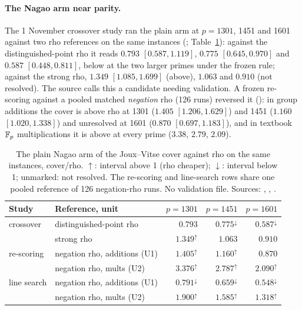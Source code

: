 \paragraph{The Nagao arm near parity.} The 1 November crossover study ran
the plain arm at $p=1301$, 1451 and 1601 against two rho references on the
same instances (;
Table~\ref{tab:jac-nagao}):
against the distinguished-point rho it reads $0.793$ $[0.587,1.119]$,
$0.775$ $[0.645,0.970]$ and $0.587$ $[0.448,0.811]$, below at the two larger
primes under the frozen rule; against the strong rho, $1.349$
$[1.085,1.699]$ (above), $1.063$ and $0.910$ (not resolved). The source calls
this a candidate needing validation. A frozen re-scoring against a pooled
matched \emph{negation} rho (126 runs) reversed it
(): in group
additions the cover is above rho at 1301 ($1.405$ $[1.206,1.629]$) and 1451
($1.160$ $[1.020,1.338]$) and unresolved at 1601 ($0.870$ $[0.697,1.183]$), and
in textbook $\mathbb{F}_p$ multiplications it is above at every prime ($3.38$, $2.79$,
$2.09$).

\begin{table}[t]
\centering\small
\begin{tabular}{@{}llrrr@{}}
\toprule
Study & Reference, unit & $p=1301$ & $p=1451$ & $p=1601$ \\
\midrule
crossover & distinguished-point rho & $0.793$ & $0.775^{\downarrow}$ & $0.587^{\downarrow}$ \\
 & strong rho & $1.349^{\uparrow}$ & $1.063$ & $0.910$ \\
\addlinespace
re-scoring & negation rho, additions (U1) & $1.405^{\uparrow}$ & $1.160^{\uparrow}$ & $0.870$ \\
 & negation rho, mults (U2) & $3.376^{\uparrow}$ & $2.787^{\uparrow}$ & $2.090^{\uparrow}$ \\
\addlinespace
line search & negation rho, additions (U1) & $0.791^{\downarrow}$ & $0.659^{\downarrow}$ & $0.548^{\downarrow}$ \\
 & negation rho, mults (U2) & $1.900^{\uparrow}$ & $1.585^{\uparrow}$ & $1.318^{\uparrow}$ \\
\bottomrule
\end{tabular}
\caption[]{The plain Nagao arm of the Joux--Vitse cover against rho on the
same instances, cover/rho. $\uparrow$: interval above 1 (rho cheaper);
$\downarrow$: interval below 1; unmarked: not resolved. The re-scoring and
line-search rows share one pooled reference of 126 negation-rho runs. No
validation file. Sources: ,
,
.}
\label{tab:jac-nagao}
\end{table}

